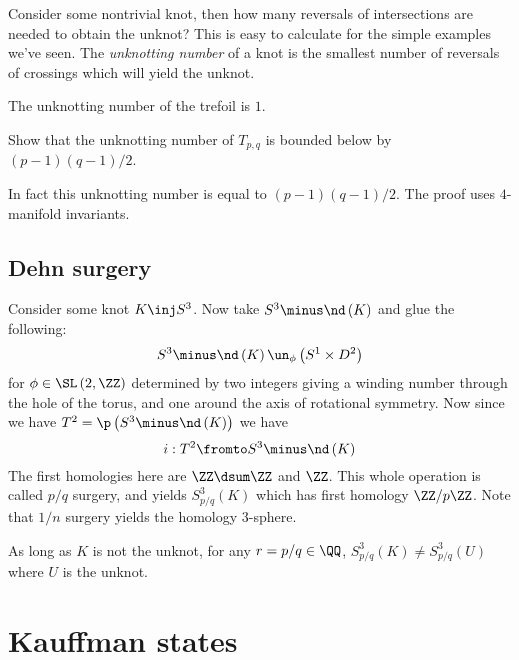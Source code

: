 \documentclass{amsproc}
\begin{document}
Consider some nontrivial knot, then how many reversals of intersections are needed
to obtain the unknot?
This is easy to calculate for the simple examples we've seen.
The \emph{unknotting number} of a knot is the smallest number of reversals of crossings
which will yield the unknot.

\begin{exm}
The unknotting number of the trefoil is $1$.
\end{exm}

\begin{exr}
Show that the unknotting number of $T_{p,q}$ is bounded below by
$\left( p-1 \right)\left( q-1 \right) / 2$.
\end{exr}

In fact this unknotting number is equal to $\left( p-1 \right)\left( q-1 \right) / 2$.
The proof uses $4$-manifold invariants.

\subsection{Dehn surgery}

Consider some knot $K\inj S^3$. 
Now take $S^3 \minus \nd\left( K \right)$ and 
glue the following:
\begin{equation}
S^3\minus \nd\left( K \right)\un_\phi \left( S^1\times D^2 \right)
\end{equation}
for $\phi\in \SL\left( 2,\ZZ \right)$ determined by two integers
giving a winding number through the hole of the torus, 
and one around the axis of rotational symmetry.
Now since we have $T^2 = \p\left( S^3\minus \nd\left( K \right) \right)$ we have
\begin{equation}
i:T^2 \fromto S^3\minus \nd\left( K \right)
\end{equation}
The first homologies here are $\ZZ \dsum \ZZ$ and $\ZZ$.
This whole operation is called $p / q$ surgery, and yields
$S^3_{p / q}\left( K \right)$ which has first homology $\ZZ / p \ZZ$.
Note that $1 / n$ surgery yields the homology $3$-sphere.

\begin{thm}
As long as $K$ is not the unknot, for any $r = p / q\in \QQ$, 
$S^3_{p / q}\left( K \right) \neq S_{p/q}^3 \left( U \right)$
where $U$ is the unknot.
\end{thm}

\section{Kauffman states}
\end{document}
